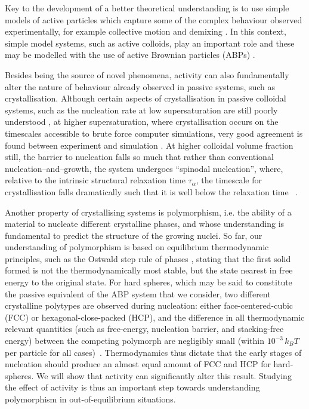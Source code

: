 Key to the development of a better theoretical understanding is to use simple models of active particles which capture some of the complex behaviour observed experimentally, for example collective motion and demixing \cite{vicsek1995,gregoire2004,wang2011,mognetti2013,redner2013,stenhammar2014,fodor2016,cates2015,pohl2014,zottl2014,tjhung2018}. In this context, simple model systems, such as active colloids, play an important role and these may be modelled with the use of active Brownian particles (ABPs) \cite{marchetti2016}.

Besides being the source of novel phenomena, activity can also fundamentally alter the nature of behaviour already observed in passive systems, such as crystallisation. Although certain aspects of crystallisation in passive colloidal systems, such as the nucleation rate at low supersaturation are still poorly understood \cite{auer2004,palberg2014,wood2018,schilling2010,radu2014,tateno2019,kawasaki2010,filion2011,russo2013,espinosa2019,fiorucci2020}, at higher supersaturation, where crystallisation occurs on the timescales accessible to brute force computer simulations, very good agreement is found between experiment and simulation \cite{taffs2013}. At higher colloidal volume fraction still, the barrier to nucleation falls so much that rather than conventional nucleation--and--growth, the system undergoes ``spinodal nucleation'', where, relative to the intrinsic structural relaxation time $\tau_\alpha$,  the timescale for crystallisation falls dramatically such that it is well below the relaxation time ~\cite{taffs2013,zaccarelli2009,valeriani2012,sanz2014,yanagishima2017}.


Another property of crystallising systems is polymorphism, i.e. the ability of a material to nucleate different crystalline phases, and whose understanding is fundamental to predict the structure of the growing nuclei. So far, our understanding of polymorphism is based on equilibrium thermodynamic principles, such as the Ostwald step rule of phases \cite{ostwald1897}, stating that the first solid formed is not the thermodynamically most stable, but the state nearest in free energy to the original state. For hard spheres, which may be said to constitute the passive equivalent of the ABP system that we consider, two different crystalline polytypes are observed during nucleation: either face-centered-cubic (FCC) or hexagonal-close-packed (HCP), and the difference in all thermodynamic relevant quantities (such as free-energy, nucleation barrier, and stacking-free energy) between the competing polymorph are negligibly small (within $10^{-3}\,k_BT$ per particle for all cases)~\cite{woodcock1997,pronk1999}. Thermodynamics thus dictate that the early stages of nucleation should produce an almost equal amount of FCC and HCP for hard-spheres. We will show that activity can significantly alter this result. Studying the effect of activity is thus an important step towards understanding polymorphism in out-of-equilibrium situations.

